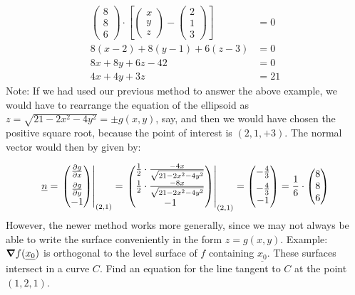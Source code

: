 \documentclass{article}
\newcommand{\n}{\leavevmode \newline} %
\newcommand{\nn}{\leavevmode \newline \newline} %
\numberwithin{equation}{subsection} %
\begin{document}
\begin{equation}
    \begin{split}
        \begin{pmatrix}
        8 \\ 8 \\ 6
        \end{pmatrix}
        \cdot
        \left[
        \begin{pmatrix}
        x \\ y \\ z
        \end{pmatrix}
        -
        \begin{pmatrix}
        2 \\ 1 \\ 3
        \end{pmatrix}
        \right]
        &=0
        \\
        8(x-2)+8(y-1)+6(z-3)&=0\\
        8x+8y+6z-42&=0\\
        4x+4y+3z&=21
    \end{split}
\end{equation}
\n
Note: If we had used our previous method to answer the above example, we would have to rearrange the equation of the ellipsoid as $z=\sqrt{21-2x^2-4y^2}=\pm g(x,y)$, say, and then we would have chosen the positive square root, because the point of interest is $(2,1,+3)$. The normal vector would then by given by:

\begin{equation}
    \underline{n} =
    \left.
    \begin{pmatrix}
        \pdv{g}{x} \vspace{0.5em} \\ \pdv{g}{y} \\ -1
    \end{pmatrix}
    \right|_{(2,1)}
    =
    \left.
    \begin{pmatrix}
        \frac{1}{2} \cdot \frac{-4x}{\sqrt{21-2x^2-4y^2}} \\ \frac{1}{2} \cdot \frac{-8x}{\sqrt{21-2x^2-4y^2}} \\ -1
    \end{pmatrix}
    \right|_{(2,1)}
    =
    \begin{pmatrix}
        -\frac{4}{3} \vspace{0.5em} \\ -\frac{4}{3} \\ -1
    \end{pmatrix}
    = \frac{1}{6} \cdot
    \begin{pmatrix}
        8 \\ 8 \\ 6
    \end{pmatrix}
\end{equation}
\n
However, the newer method works more generally, since we may not always be able to write the surface conveniently in the form $z=g(x,y)$.
\nn
Example: $\grad f(\underline{x_0})$ is orthogonal to the level surface of $f$ containing $\underline{x_0}$. These surfaces intersect in a curve $C$. Find an equation for the line tangent to $C$ at the point $(1,2,1)$.
\end{document}
